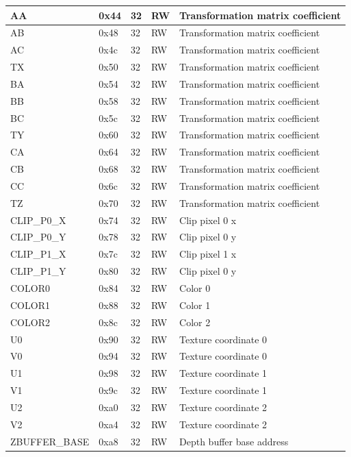 \documentclass[10pt,a4paper]{article}
\begin{document}
\begin{tabular}{|l|l|l|l|l|}
\hline AA              & 0x44 & 32 & RW & Transformation matrix coefficient\\
\hline AB              & 0x48 & 32 & RW & Transformation matrix coefficient\\
\hline AC              & 0x4c & 32 & RW & Transformation matrix coefficient\\
\hline TX              & 0x50 & 32 & RW & Transformation matrix coefficient\\
\hline BA              & 0x54 & 32 & RW & Transformation matrix coefficient\\
\hline BB              & 0x58 & 32 & RW & Transformation matrix coefficient\\
\hline BC              & 0x5c & 32 & RW & Transformation matrix coefficient\\
\hline TY              & 0x60 & 32 & RW & Transformation matrix coefficient\\
\hline CA              & 0x64 & 32 & RW & Transformation matrix coefficient\\
\hline CB              & 0x68 & 32 & RW & Transformation matrix coefficient\\
\hline CC              & 0x6c & 32 & RW & Transformation matrix coefficient\\
\hline TZ              & 0x70 & 32 & RW & Transformation matrix coefficient\\

\hline CLIP\_P0\_X     & 0x74 & 32 & RW & Clip pixel 0 x \\
\hline CLIP\_P0\_Y     & 0x78 & 32 & RW & Clip pixel 0 y \\
\hline CLIP\_P1\_X     & 0x7c & 32 & RW & Clip pixel 1 x \\
\hline CLIP\_P1\_Y     & 0x80 & 32 & RW & Clip pixel 0 y \\

\hline COLOR0          & 0x84 & 32 & RW & Color 0 \\
\hline COLOR1          & 0x88 & 32 & RW & Color 1 \\
\hline COLOR2          & 0x8c & 32 & RW & Color 2 \\

\hline U0              & 0x90 & 32 & RW & Texture coordinate 0 \\
\hline V0              & 0x94 & 32 & RW & Texture coordinate 0 \\
\hline U1              & 0x98 & 32 & RW & Texture coordinate 1 \\
\hline V1              & 0x9c & 32 & RW & Texture coordinate 1 \\
\hline U2              & 0xa0 & 32 & RW & Texture coordinate 2 \\
\hline V2              & 0xa4 & 32 & RW & Texture coordinate 2 \\

\hline ZBUFFER\_BASE   & 0xa8 & 32 & RW & Depth buffer base address \\

\hline 
\end{tabular} 
\end{document}
